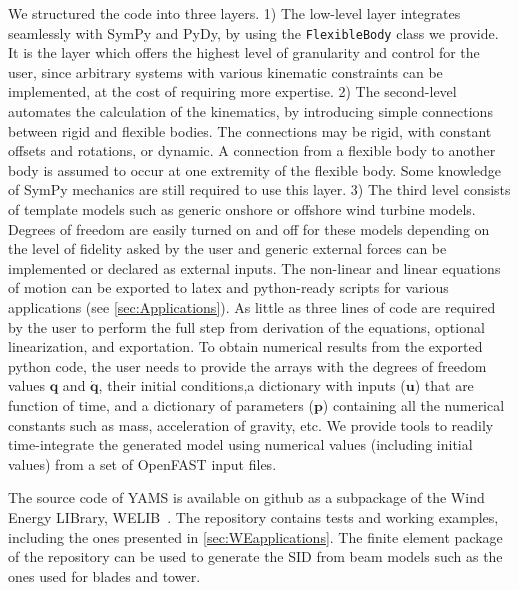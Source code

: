 \documentclass[wes, manuscript]{copernicus}
\renewcommand{\v}[1]{\boldsymbol{#1}}
\begin{document}
We structured the code into three layers.
1) The low-level layer integrates seamlessly with SymPy and PyDy, by using the \texttt{FlexibleBody} class we provide.
It is the layer which offers the highest level of granularity and control for the user, since arbitrary systems with various kinematic constraints can be implemented, at the cost of requiring more expertise.
2) The second-level automates the calculation of the kinematics, by introducing simple connections between rigid and flexible bodies.
The connections may be rigid, with constant offsets and rotations, or dynamic.
A connection from a flexible body to another body is assumed to occur at one extremity of the flexible body.
Some knowledge of SymPy mechanics are still required to use this layer.
3) The third level consists of template models such as generic onshore or offshore wind turbine models.
Degrees of freedom are easily turned on and off for these models depending on the level of fidelity asked by the user and generic external forces can be implemented or declared as external inputs.
The non-linear and linear equations of motion can be exported to latex and python-ready scripts for various applications (see \autoref{sec:Applications}).
As little as three lines of code are required by the user to perform the full step from derivation of the equations, optional linearization, and exportation.
To obtain numerical results from the exported python code, the user needs to provide the arrays with the degrees of freedom values $\v{q}$ and $\v{\dot{q}}$, their initial conditions,a dictionary with inputs ($\v{u}$) that are function of time, and a dictionary of parameters ($\v{p}$) containing all the numerical constants such as mass, acceleration of gravity, etc.
We provide tools to readily time-integrate the generated model using numerical values (including initial values) from a set of OpenFAST input files.

The source code of YAMS is available on github as a subpackage of the Wind Energy LIBrary, WELIB~\citep{WELIBgithub}. The repository contains tests and working examples, including the ones presented in \autoref{sec:WEapplications}.
The finite element package of the repository can be used to generate the SID from beam models such as the ones used for blades and tower.


\end{document}
